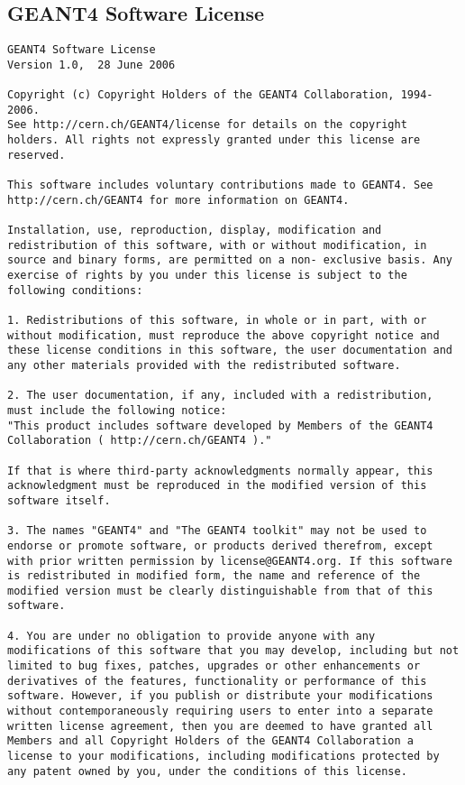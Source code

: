 \documentclass[12pt]{article}
\begin{document}
\subsection{GEANT4 Software License}
\begin{lstlisting}
GEANT4 Software License
Version 1.0,  28 June 2006
 
Copyright (c) Copyright Holders of the GEANT4 Collaboration, 1994-2006.
See http://cern.ch/GEANT4/license for details on the copyright holders. All rights not expressly granted under this license are reserved.

This software includes voluntary contributions made to GEANT4. See http://cern.ch/GEANT4 for more information on GEANT4.

Installation, use, reproduction, display, modification and redistribution of this software, with or without modification, in source and binary forms, are permitted on a non- exclusive basis. Any exercise of rights by you under this license is subject to the following conditions:

1. Redistributions of this software, in whole or in part, with or without modification, must reproduce the above copyright notice and these license conditions in this software, the user documentation and any other materials provided with the redistributed software.

2. The user documentation, if any, included with a redistribution, must include the following notice:
"This product includes software developed by Members of the GEANT4 Collaboration ( http://cern.ch/GEANT4 )."

If that is where third-party acknowledgments normally appear, this acknowledgment must be reproduced in the modified version of this software itself.

3. The names "GEANT4" and "The GEANT4 toolkit" may not be used to endorse or promote software, or products derived therefrom, except with prior written permission by license@GEANT4.org. If this software is redistributed in modified form, the name and reference of the modified version must be clearly distinguishable from that of this software.

4. You are under no obligation to provide anyone with any modifications of this software that you may develop, including but not limited to bug fixes, patches, upgrades or other enhancements or derivatives of the features, functionality or performance of this software. However, if you publish or distribute your modifications without contemporaneously requiring users to enter into a separate written license agreement, then you are deemed to have granted all Members and all Copyright Holders of the GEANT4 Collaboration a license to your modifications, including modifications protected by any patent owned by you, under the conditions of this license.


\end{lstlisting}
\end{document}
